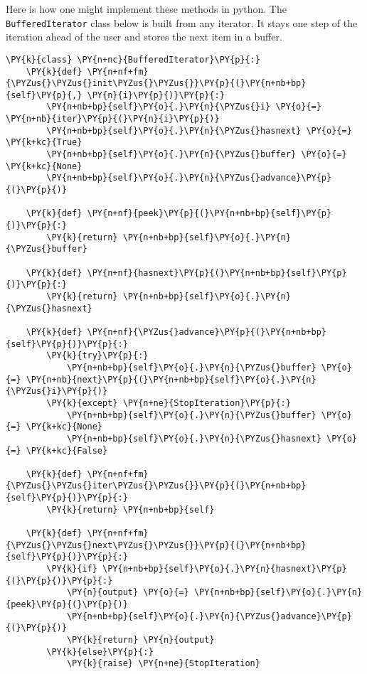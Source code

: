 Here is how one might implement these methods in python.
The \texttt{BufferedIterator} class below is built from any iterator.
It stays one step of the iteration ahead of the user and stores the next item in a buffer.

\begin{Verbatim}[commandchars=\\\{\}]
\PY{k}{class} \PY{n+nc}{BufferedIterator}\PY{p}{:}
    \PY{k}{def} \PY{n+nf+fm}{\PYZus{}\PYZus{}init\PYZus{}\PYZus{}}\PY{p}{(}\PY{n+nb+bp}{self}\PY{p}{,} \PY{n}{i}\PY{p}{)}\PY{p}{:}
        \PY{n+nb+bp}{self}\PY{o}{.}\PY{n}{\PYZus{}i} \PY{o}{=} \PY{n+nb}{iter}\PY{p}{(}\PY{n}{i}\PY{p}{)}
        \PY{n+nb+bp}{self}\PY{o}{.}\PY{n}{\PYZus{}hasnext} \PY{o}{=} \PY{k+kc}{True}
        \PY{n+nb+bp}{self}\PY{o}{.}\PY{n}{\PYZus{}buffer} \PY{o}{=} \PY{k+kc}{None}
        \PY{n+nb+bp}{self}\PY{o}{.}\PY{n}{\PYZus{}advance}\PY{p}{(}\PY{p}{)}

    \PY{k}{def} \PY{n+nf}{peek}\PY{p}{(}\PY{n+nb+bp}{self}\PY{p}{)}\PY{p}{:}
        \PY{k}{return} \PY{n+nb+bp}{self}\PY{o}{.}\PY{n}{\PYZus{}buffer}

    \PY{k}{def} \PY{n+nf}{hasnext}\PY{p}{(}\PY{n+nb+bp}{self}\PY{p}{)}\PY{p}{:}
        \PY{k}{return} \PY{n+nb+bp}{self}\PY{o}{.}\PY{n}{\PYZus{}hasnext}

    \PY{k}{def} \PY{n+nf}{\PYZus{}advance}\PY{p}{(}\PY{n+nb+bp}{self}\PY{p}{)}\PY{p}{:}
        \PY{k}{try}\PY{p}{:}
            \PY{n+nb+bp}{self}\PY{o}{.}\PY{n}{\PYZus{}buffer} \PY{o}{=} \PY{n+nb}{next}\PY{p}{(}\PY{n+nb+bp}{self}\PY{o}{.}\PY{n}{\PYZus{}i}\PY{p}{)}
        \PY{k}{except} \PY{n+ne}{StopIteration}\PY{p}{:}
            \PY{n+nb+bp}{self}\PY{o}{.}\PY{n}{\PYZus{}buffer} \PY{o}{=} \PY{k+kc}{None}
            \PY{n+nb+bp}{self}\PY{o}{.}\PY{n}{\PYZus{}hasnext} \PY{o}{=} \PY{k+kc}{False}

    \PY{k}{def} \PY{n+nf+fm}{\PYZus{}\PYZus{}iter\PYZus{}\PYZus{}}\PY{p}{(}\PY{n+nb+bp}{self}\PY{p}{)}\PY{p}{:}
        \PY{k}{return} \PY{n+nb+bp}{self}

    \PY{k}{def} \PY{n+nf+fm}{\PYZus{}\PYZus{}next\PYZus{}\PYZus{}}\PY{p}{(}\PY{n+nb+bp}{self}\PY{p}{)}\PY{p}{:}
        \PY{k}{if} \PY{n+nb+bp}{self}\PY{o}{.}\PY{n}{hasnext}\PY{p}{(}\PY{p}{)}\PY{p}{:}
            \PY{n}{output} \PY{o}{=} \PY{n+nb+bp}{self}\PY{o}{.}\PY{n}{peek}\PY{p}{(}\PY{p}{)}
            \PY{n+nb+bp}{self}\PY{o}{.}\PY{n}{\PYZus{}advance}\PY{p}{(}\PY{p}{)}
            \PY{k}{return} \PY{n}{output}
        \PY{k}{else}\PY{p}{:}
            \PY{k}{raise} \PY{n+ne}{StopIteration}
\end{Verbatim}



